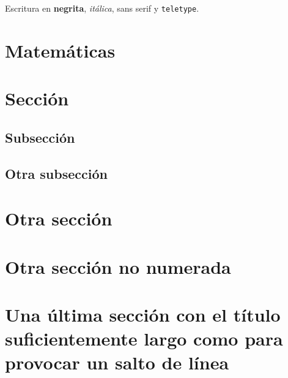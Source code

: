 \documentclass[12pt,a4paper,twoside]{article}
\begin{document}
Escritura en \textbf{negrita}, \textit{itálica}, \textsf{sans serif} y \texttt{teletype}.

\section{Matemáticas}



\section{Sección}

\lipsum[1-15]

\subsection{Subsección}

\lipsum[1-15]

\subsection{Otra subsección}

\lipsum[1-15]		

\section{Otra sección}

\lipsum[1-15]	

\section*{Otra sección no numerada}
\ifdefined\HCode\else
{}
\fi

\lipsum[1-15]			

\section{Una última sección con el título suficientemente largo como para provocar un salto de línea}
\label{sec:last}
\lipsum[1-15]	

%
\end{document}
